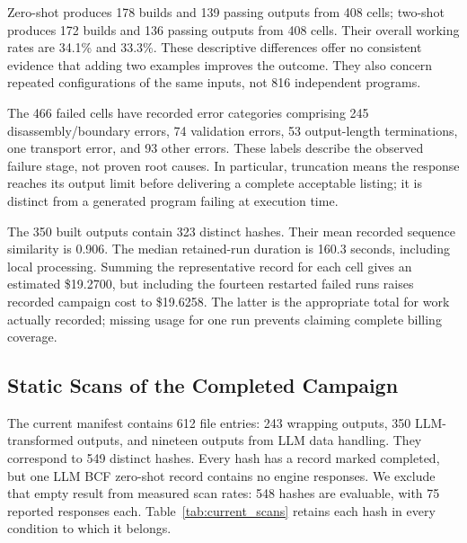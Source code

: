 Zero-shot produces 178 builds and 139 passing outputs from 408 cells;
two-shot produces 172 builds and 136 passing outputs from 408 cells.
Their overall working rates are 34.1\% and 33.3\%. These descriptive
differences offer no consistent evidence that adding two examples improves
the outcome. They also concern repeated configurations of the same inputs,
not 816 independent programs.

The 466 failed cells have recorded error categories comprising 245
disassembly/boundary errors, 74 validation errors, 53 output-length
terminations, one transport error, and 93 other errors. These labels
describe the observed failure stage, not proven root causes. In particular,
truncation means the response reaches its output limit before delivering
a complete acceptable listing; it is distinct from a generated program
failing at execution time.

The 350 built outputs contain 323 distinct hashes. Their mean recorded
sequence similarity is 0.906. The median retained-run duration is
160.3 seconds, including local processing. Summing the representative
record for each cell gives an estimated \$19.2700, but including the
fourteen restarted failed runs raises recorded campaign cost to
\$19.6258. The latter is the appropriate total for work actually recorded;
missing usage for one run prevents claiming complete billing coverage.

\subsection{Static Scans of the Completed Campaign}
The current manifest contains 612 file entries: 243 wrapping outputs,
350 LLM-transformed outputs, and nineteen outputs from LLM data handling.
They correspond to 549 distinct hashes. Every hash has a record marked
completed, but one LLM BCF zero-shot record contains no engine responses.
We exclude that empty result from measured scan rates: 548 hashes are
evaluable, with 75 reported responses each. Table~\ref{tab:current_scans}
retains each hash in every condition to which it belongs.



